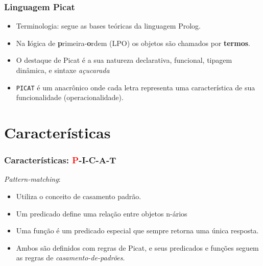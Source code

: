 \documentclass[10pt]{beamer}
\begin{document}

\begin{frame}
    \frametitle{Linguagem Picat}
    \begin{itemize}
      \item Terminologia: segue as bases teóricas da linguagem Prolog.
    
      \item Na \textbf{l}ógica de \textbf{p}rimeira-\textbf{o}rdem (LPO) os objetos são chamados por \textbf{termos}.
      
      \item O destaque de Picat é a sua natureza declarativa, funcional, tipagem dinâmica, e sintaxe \textit{açucarada}
      
      \item \texttt{PICAT} é um anacrônico onde cada letra representa uma característica  de sua funcionalidade (operacionalidade).
    
    \end{itemize}
\end{frame}


\section{Características}
\begin{frame}
    \frametitle{Características: \textcolor{red}{P}-I-C-A-T}
 
 \textit{Pattern-matching}:\\ 
 \begin{itemize}
  \item     Utiliza o conceito de casamento padrão. 
  \item    Um predicado define uma relação entre objetos n-ários
  \item     Uma função é um predicado especial que sempre retorna uma única resposta. 
  \item     Ambos são definidos com regras de Picat, e seus predicados e funções seguem as regras de \textit{casamento-de-padrões}.

\end{itemize}

\end{frame}

\end{document}
